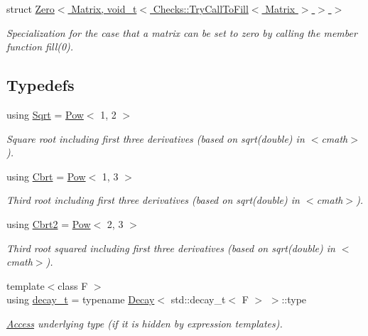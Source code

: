 \begin{DoxyCompactItemize}
struct \hyperlink{structFunG_1_1Zero_3_01Matrix_00_01void__t_3_01Checks_1_1TryCallToFill_3_01Matrix_01_4_01_4_01_4}{Zero$<$ Matrix, void\+\_\+t$<$ Checks\+::\+Try\+Call\+To\+Fill$<$ Matrix $>$ $>$ $>$}
\begin{DoxyCompactList}\small\item\em Specialization for the case that a matrix can be set to zero by calling the member function fill(0). \end{DoxyCompactList}\end{DoxyCompactItemize}
\subsection*{Typedefs}
\begin{DoxyCompactItemize}
\item 
using \hyperlink{group__CMathGroup_ga70c69680e967f5ccb79c07e50d44739d}{Sqrt} = \hyperlink{structFunG_1_1Pow}{Pow}$<$ 1, 2 $>$
\begin{DoxyCompactList}\small\item\em Square root including first three derivatives (based on sqrt(double) in $<$cmath$>$). \end{DoxyCompactList}\item 
using \hyperlink{group__CMathGroup_gaff369d639f7a316b3f22982e806cb45f}{Cbrt} = \hyperlink{structFunG_1_1Pow}{Pow}$<$ 1, 3 $>$
\begin{DoxyCompactList}\small\item\em Third root including first three derivatives (based on sqrt(double) in $<$cmath$>$). \end{DoxyCompactList}\item 
using \hyperlink{group__CMathGroup_gab63795eecd1e9a55ea26b24125053f2d}{Cbrt2} = \hyperlink{structFunG_1_1Pow}{Pow}$<$ 2, 3 $>$
\begin{DoxyCompactList}\small\item\em Third root squared including first three derivatives (based on sqrt(double) in $<$cmath$>$). \end{DoxyCompactList}\item 
{\footnotesize template$<$class F $>$ }\\using \hyperlink{namespaceFunG_a7ff91644f18a190ac3d4fc9e970ebe2e}{decay\+\_\+t} = typename \hyperlink{structFunG_1_1Decay}{Decay}$<$ std\+::decay\+\_\+t$<$ F $>$ $>$\+::type
\begin{DoxyCompactList}\small\item\em \hyperlink{namespaceFunG_1_1Access}{Access} underlying type (if it is hidden by expression templates). \end{DoxyCompactList}\item 

\end{DoxyCompactItemize}
